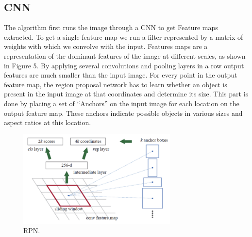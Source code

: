 \documentclass{ndjflart}
\theoremstyle{definition}
\theoremstyle{remark}
\begin{document}
\subsection{CNN}\label{ssecnotes}
The algorithm first runs the image through a CNN to get Feature maps extracted. To get a single feature map we run a filter represented by a matrix of weights with which we convolve with the input. Features maps are a representation of the dominant features of the image at different scales, as shown in Figure 5. By applying several convolutions and pooling layers in a row output features are much smaller than the input image. For every point in the output feature map, the region proposal network has to learn whether an object is present in the input image at that coordinates and determine its size. This part is done by placing a set of “Anchors” on the input image for each location on the output feature map. These anchors indicate possible objects in various sizes and aspect ratios at this location.

\begin{figure}
\begin{center}
\vspace{0.5em}
    \includegraphics[width=8cm]{images/RPN}
    \vspace{-.5em}
\caption{RPN. }
\label{fig:framework}
    \end{center}
\end{figure}
\end{document}
